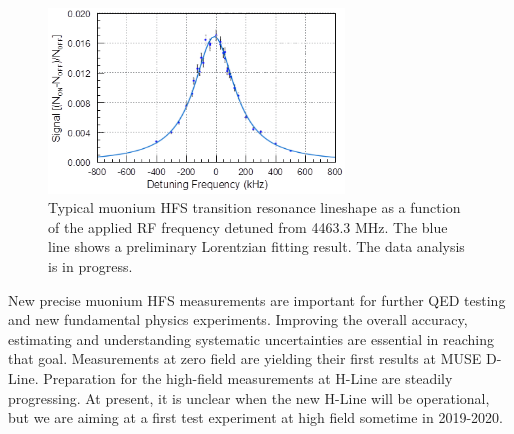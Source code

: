 \begin{figure}[th]
 \centering
 \includegraphics[width=0.7\textwidth, bb=0 0 227 142]
                 {./Fig/MuHFS-MuSEUM-lineshape.png}
\caption{\label{fig:MuSEUM-MuSEUM-lineshape}
Typical muonium HFS transition resonance lineshape as a
function of the applied RF frequency detuned from 4463.3 MHz.
The blue line shows a preliminary Lorentzian fitting result.
The data analysis is in progress.
}
\end{figure}


New precise muonium HFS measurements are important for further
QED testing and new fundamental physics experiments.  Improving
the overall accuracy, estimating and understanding systematic
uncertainties are essential in reaching that goal.  Measurements
at zero field are yielding their first results at MUSE D-Line.
Preparation for the high-field measurements at H-Line are
steadily progressing.  At present, it is unclear when the
new H-Line will be operational, but we are aiming at a first
test experiment at high field sometime in 2019-2020.



